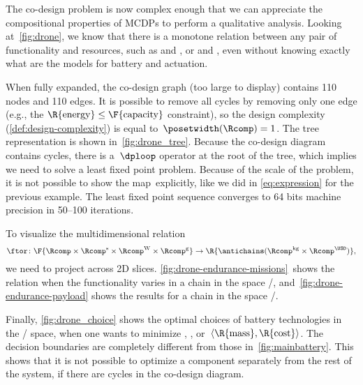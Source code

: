 The co-design problem is now complex enough that we can appreciate
the compositional properties of MCDPs to perform a qualitative analysis.
Looking at~\cref{fig:drone}, we know that there is a monotone relation
between any pair of functionality and resources, such as 
and , or  and , even without knowing
exactly what are the models for battery and actuation.

When fully expanded, the co-design graph (too large to display) contains
110 nodes and 110 edges. It is possible to remove all cycles by removing
only one edge (e.g., the $\R{\text{energy}}\leq\text{\F{\text{capacity}}}$
constraint), so the design complexity (\cref{def:design-complexity})
is equal to~$\posetwidth(\Rcomp)=1$. The
tree representation is shown in~\cref{fig:drone_tree}. Because the
co-design diagram contains cycles, there is a~$\dploop$ operator
at the root of the tree, which implies we need to solve a least fixed
point problem. Because of the scale of the problem, it is not possible
to show the map~\ftor explicitly, like we did in \cref{eq:expression}
for the previous example. The least fixed point sequence converges
to 64 bits machine precision in 50--100 iterations.

To visualize the multidimensional relation
\[
    \ftor\colon\F{\Rcomp\times\Rcomp^{\text{s}}\times\Rcomp^{\text{W}}\times\Rcomp^{\text{g}}}\rightarrow\R{\antichains(\Rcomp^{\text{kg}}\times\Rcomp^{\USD})},
\]
we need to project across 2D slices. \cref{fig:drone-endurance-missions}~shows
the relation when the functionality varies in a chain in the space
/, and~\cref{fig:drone-endurance-payload}
shows the results for a chain in the space /.

Finally, \cref{fig:drone_choice} shows the optimal choices of battery
technologies in the / space, when one
wants to minimize , , or~$\left\langle \R{\text{mass}},\R{\text{cost}}\right\rangle $.
The decision boundaries are completely different from those in~\cref{fig:mainbattery}.
This shows that it is not possible to optimize a component separately
from the rest of the system, if there are cycles in the co-design
diagram.

